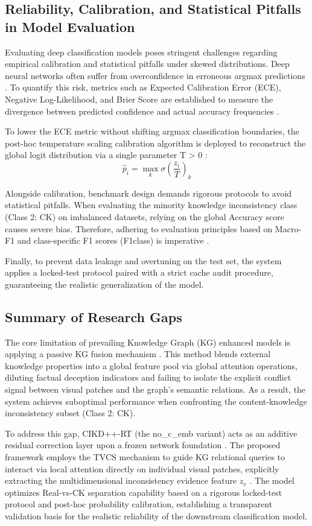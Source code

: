 \subsection{Reliability, Calibration, and Statistical Pitfalls in Model Evaluation}
Evaluating deep classification models poses stringent challenges regarding empirical calibration and statistical pitfalls under skewed distributions. Deep neural networks often suffer from overconfidence in erroneous argmax predictions \cite{ref10}. To quantify this risk, metrics such as Expected Calibration Error (ECE), Negative Log-Likelihood, and Brier Score are established to measure the divergence between predicted confidence and actual accuracy frequencies \cite{ref10, ref30, ref31}.

To lower the ECE metric without shifting argmax classification boundaries, the post-hoc temperature scaling calibration algorithm is deployed to reconstruct the global logit distribution via a single parameter T > 0 \cite{ref10}:
\begin{equation}
\hat{p}_i = \max_k \sigma \left( \frac{z_i}{T} \right)_k
\end{equation}

Alongside calibration, benchmark design demands rigorous protocols to avoid statistical pitfalls. When evaluating the minority knowledge inconsistency class (Class 2: CK) on imbalanced datasets, relying on the global Accuracy score causes severe bias. Therefore, adhering to evaluation principles based on Macro-F1 and class-specific F1 scores (F1class) is imperative \cite{ref32}.

Finally, to prevent data leakage and overtuning on the test set, the system applies a locked-test protocol paired with a strict cache audit procedure, guaranteeing the realistic generalization of the model.

\subsection{Summary of Research Gaps}
The core limitation of prevailing Knowledge Graph (KG) enhanced models is applying a passive KG fusion mechanism \cite{ref5}. This method blends external knowledge properties into a global feature pool via global attention operations, diluting factual deception indicators and failing to isolate the explicit conflict signal between visual patches and the graph's semantic relations. As a result, the system achieves suboptimal performance when confronting the content-knowledge inconsistency subset (Class 2: CK).

To address this gap, CIKD++-RT (the no\_c\_emb variant) acts as an additive residual correction layer upon a frozen network foundation \cite{ref29}. The proposed framework employs the TVCS mechanism to guide KG relational queries to interact via local attention directly on individual visual patches, explicitly extracting the multidimensional inconsistency evidence feature $z_v$ \cite{ref33, ref34, ref35, ref36, ref37}. The model optimizes Real-vs-CK separation capability based on a rigorous locked-test protocol and post-hoc probability calibration, establishing a transparent validation basis for the realistic reliability of the downstream classification model.
